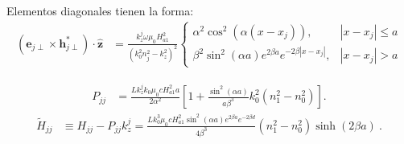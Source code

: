 Elementos diagonales tienen la forma:
\begin{align*}
	\left(\textbf{e}_{j\perp}\times\textbf{h}_{j\perp}^*\right)\cdot \hat{\textbf{z}}&=\frac{k_z^j\omega\mu_0 H_{a1}^2}{(k_0^2n_j^2-k_z^2)^2} \left\{ \begin{matrix}
\alpha^2\cos^2(\alpha (x-x_j)), & |x-x_j| \le a
\\
\beta^2 \sin^2(\alpha a) e^{2\beta a} e^{-2\beta|x-x_j|}, & |x-x_j|>a
\end{matrix}\right.
\end{align*}



\begin{align*}
	P_{jj} &= \frac{L k_z^j  k_0 \mu_0 c H_{a1}^2  a}{2 \alpha^2} \left[1 + \frac{\sin^2(\alpha a)}{a \beta^3 } k_0^2 \left( n_1^2 - n_0^2 \right) \right].
\end{align*}
\begin{align*}
	\tilde{H}_{jj} &\equiv H_{jj} - P_{jj} k_z^j =
	\frac{L k_0^3  \mu_0 c H_{a1}^2 \sin^2(\alpha a)e^{2\beta a}e^{-2\beta d}}{4 \beta^3 } (n_1^2-n_0^2) \sinh(2\beta a) \ .
\end{align*}

